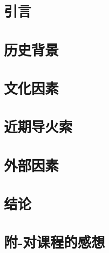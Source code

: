 \documentclass{source/Paper}
\begin{document}
\maketitles
\newpage
\tableofcontents
\newpage
\setcounter{section}{-1}
\section{引言}

\section{历史背景}

\section{文化因素}

\section{近期导火索}

\section{外部因素}

\section{结论}


\newpage
\appendix
\section{附-对课程的感想}

\end{document}
